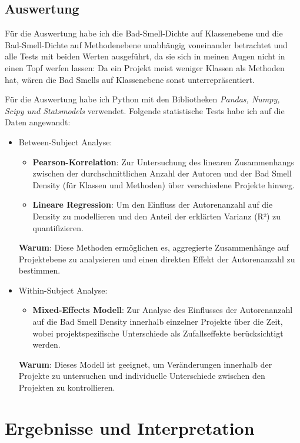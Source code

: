 \documentclass[12pt]{article}
\begin{document}

\subsection{Auswertung}
Für die Auswertung habe ich die Bad-Smell-Dichte auf Klassenebene und die Bad-Smell-Dichte auf Methodenebene unabhängig voneinander betrachtet und alle Tests mit beiden Werten ausgeführt, da sie sich in meinen Augen nicht in einen Topf werfen lassen:
Da ein Projekt meist weniger Klassen als Methoden hat, wären die Bad Smells auf Klassenebene sonst unterrepräsentiert.

Für die Auswertung habe ich Python mit den Bibliotheken \emph{Pandas, Numpy, Scipy und Statsmodels} verwendet.
Folgende statistische Tests habe ich auf die Daten angewandt:

\begin{itemize}
	\item Between-Subject Analyse:
	\begin{itemize}
		\item \textbf{Pearson-Korrelation}: Zur Untersuchung des linearen Zusammenhangs zwischen der durchschnittlichen Anzahl der Autoren und der Bad Smell Density (für Klassen und Methoden) über verschiedene Projekte hinweg.
		\item \textbf{Lineare Regression}: Um den Einfluss der Autorenanzahl auf die Density zu modellieren und den Anteil der erklärten Varianz (R²) zu quantifizieren.
	\end{itemize}
	\textbf{Warum}: Diese Methoden ermöglichen es, aggregierte Zusammenhänge auf Projektebene zu analysieren und einen direkten Effekt der Autorenanzahl zu bestimmen.
	
	\item Within-Subject Analyse:
	\begin{itemize}
		\item \textbf{Mixed-Effects Modell}: Zur Analyse des Einflusses der Autorenanzahl auf die Bad Smell Density innerhalb einzelner Projekte über die Zeit, wobei projektspezifische Unterschiede als Zufallseffekte berücksichtigt werden.
	\end{itemize}
	\textbf{Warum}: Dieses Modell ist geeignet, um Veränderungen innerhalb der Projekte zu untersuchen und individuelle Unterschiede zwischen den Projekten zu kontrollieren.
\end{itemize}

\section{Ergebnisse und Interpretation}



\end{document}
